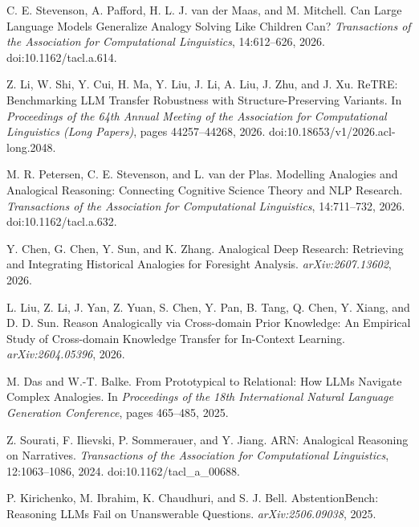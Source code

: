 
C. E. Stevenson, A. Pafford, H. L. J. van der Maas, and M. Mitchell. Can Large Language Models Generalize Analogy Solving Like Children Can? \emph{Transactions of the Association for Computational Linguistics}, 14:612--626, 2026. doi:10.1162/tacl.a.614.

Z. Li, W. Shi, Y. Cui, H. Ma, Y. Liu, J. Li, A. Liu, J. Zhu, and J. Xu. ReTRE: Benchmarking LLM Transfer Robustness with Structure-Preserving Variants. In \emph{Proceedings of the 64th Annual Meeting of the Association for Computational Linguistics (Long Papers)}, pages 44257--44268, 2026. doi:10.18653/v1/2026.acl-long.2048.

M. R. Petersen, C. E. Stevenson, and L. van der Plas. Modelling Analogies and Analogical Reasoning: Connecting Cognitive Science Theory and NLP Research. \emph{Transactions of the Association for Computational Linguistics}, 14:711--732, 2026. doi:10.1162/tacl.a.632.

Y. Chen, G. Chen, Y. Sun, and K. Zhang. Analogical Deep Research: Retrieving and Integrating Historical Analogies for Foresight Analysis. \emph{arXiv:2607.13602}, 2026.

L. Liu, Z. Li, J. Yan, Z. Yuan, S. Chen, Y. Pan, B. Tang, Q. Chen, Y. Xiang, and D. D. Sun. Reason Analogically via Cross-domain Prior Knowledge: An Empirical Study of Cross-domain Knowledge Transfer for In-Context Learning. \emph{arXiv:2604.05396}, 2026.

M. Das and W.-T. Balke. From Prototypical to Relational: How LLMs Navigate Complex Analogies. In \emph{Proceedings of the 18th International Natural Language Generation Conference}, pages 465--485, 2025.

Z. Sourati, F. Ilievski, P. Sommerauer, and Y. Jiang. ARN: Analogical Reasoning on Narratives. \emph{Transactions of the Association for Computational Linguistics}, 12:1063--1086, 2024. doi:10.1162/tacl\_a\_00688.

P. Kirichenko, M. Ibrahim, K. Chaudhuri, and S. J. Bell. AbstentionBench: Reasoning LLMs Fail on Unanswerable Questions. \emph{arXiv:2506.09038}, 2025.

